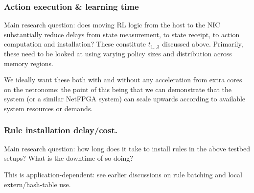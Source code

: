 \documentclass[sigconf,natbib=false]{acmart}
\begin{document}
\begin{appendices}
	\subsubsection{Action execution \& learning time}
	Main research question: does moving RL logic from the host to the NIC substantially reduce delays from state measurement, to state receipt, to action computation and installation?
	These constitute $t_{1...3}$ discussed above.
	Primarily, these need to be looked at using varying policy sizes and distribution across memory regions.
	
	We ideally want these both with and without any acceleration from extra cores on the netronome: the point of this being that we can demonstrate that the system (or a similar NetFPGA system) can scale upwards according to available system resources or demands.
	
	\subsubsection{Rule installation delay/cost.}
	Main research question: how long does it take to install rules in the above testbed setups? What is the downtime of so doing?
	
	This is application-dependent: see earlier discussions on rule batching and local extern/hash-table use.
\end{appendices}

	
\end{document}
